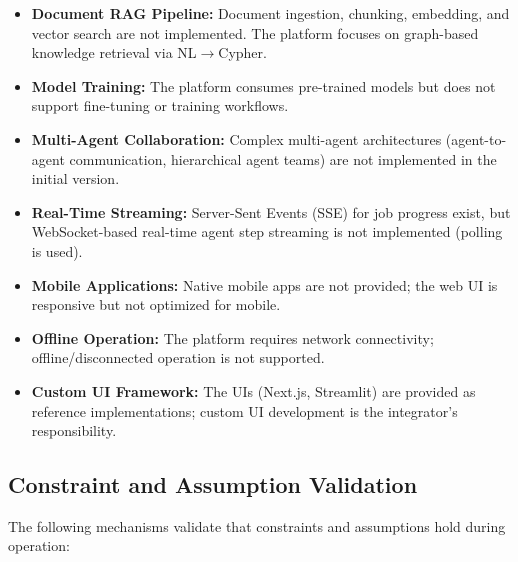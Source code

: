 \begin{itemize}
    \item \textbf{Document RAG Pipeline:} Document ingestion, chunking, embedding, and vector search are not implemented. The platform focuses on graph-based knowledge retrieval via NL$\rightarrow$Cypher.
    
    \item \textbf{Model Training:} The platform consumes pre-trained models but does not support fine-tuning or training workflows.
    
    \item \textbf{Multi-Agent Collaboration:} Complex multi-agent architectures (agent-to-agent communication, hierarchical agent teams) are not implemented in the initial version.
    
    \item \textbf{Real-Time Streaming:} Server-Sent Events (SSE) for job progress exist, but WebSocket-based real-time agent step streaming is not implemented (polling is used).
    
    \item \textbf{Mobile Applications:} Native mobile apps are not provided; the web UI is responsive but not optimized for mobile.
    
    \item \textbf{Offline Operation:} The platform requires network connectivity; offline/disconnected operation is not supported.
    
    \item \textbf{Custom UI Framework:} The UIs (Next.js, Streamlit) are provided as reference implementations; custom UI development is the integrator's responsibility.
\end{itemize}

\subsection{Constraint and Assumption Validation}
\label{subsec:constraint-validation}

The following mechanisms validate that constraints and assumptions hold during operation:

